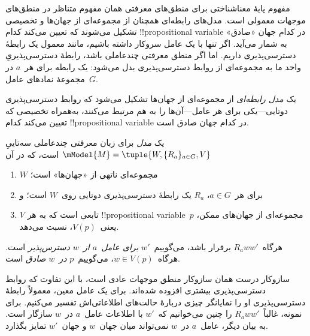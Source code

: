 \documentclass[../../../include/open-logic-section]{subfiles}
\begin{document}


مفهوم پایهٔ معناشناختی برای منطق‌های معرفتی همان مفهوم متناظر در
منطق‌های موجهات معمولی است. مدل‌های رابطه‌ای همچنان از مجموعه‌ای از
جهان‌ها و تخصیصی تشکیل می‌شوند که تعیین می‌کند کدام !!{propositional
variable} در کدام جهان «صادق» به شمار می‌آید. اگر تنها با یک عامل سروکار
داشته باشیم، مانند معمول یک رابطهٔ دسترسی‌پذیری داریم. اما اگر منطق
معرفتی چندعاملی باشد، رابطهٔ دسترسی‌پذیریِ واحد ما به مجموعه‌ای از روابط
دسترسی‌پذیری بدل می‌شود: یک رابطه برای هر~$a$ در مجموعهٔ نمادهای
عامل~$G$.

یک \emph{مدل رابطه‌ای} از مجموعه‌ای از جهان‌ها تشکیل می‌شود که روابط
دسترسی‌پذیری دوتایی---یکی برای هر عامل---آن‌ها را به هم مرتبط می‌کنند،
به‌همراه تخصیصی که تعیین می‌کند کدام !!{propositional variable} در کدام
جهان صادق است.

\begin{defn}
  یک \emph{مدل} برای زبان معرفتی چندعاملی سه‌تاییِ
  $\mModel{M} = \tuple{W, \{R_a\}_{a\in G}, V}$ است، که در آن
  \begin{enumerate}
  \item $W$ مجموعه‌ای ناتهی از «جهان‌ها» است؛
  \item برای هر~$a \in G$، ${R}_a$ یک رابطهٔ دسترسی‌پذیری دوتایی
  روی~$W$ است؛ و
  \item $V$ تابعی است که به هر !!{propositional
    variable}~$p$ مجموعه‌ای از جهان‌های ممکن، یعنی~$V(p)$، نسبت می‌دهد.
  \end{enumerate}
  هرگاه~$R_a ww'$ برقرار باشد، می‌گوییم~$w'$ \emph{برای عامل~$a$
    از~$w$ دسترس‌پذیر} است. هرگاه~$w \in V(p)$، می‌گوییم~$p$
  \emph{در~$w$ صادق} است.
\end{defn}

سازوکار درست همان سازوکار منطق موجهات عادی است، با این تفاوت که روابط
دسترسی‌پذیری بیشتری افزوده شده‌اند. برای یک عامل معین، معمولاً رابطهٔ
دسترسی‌پذیری او را نمایانگر چیزی دربارهٔ حالت‌های اطلاعاتی‌اش تفسیر
می‌کنیم. برای نمونه، غالباً~$R_a ww'$ را چنین می‌خوانیم که~$w'$ با
اطلاعات عامل~$a$ در~$w$ سازگار است. به بیان دیگر، عامل~$a$ در~$w$
نمی‌تواند میان جهان~$w$ و جهان~$w'$ تمایز بگذارد.
\end{document}
